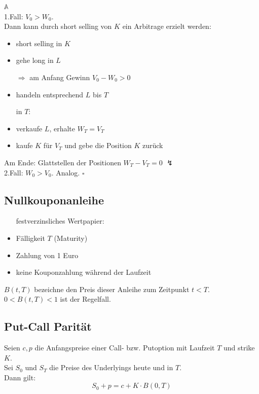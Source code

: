 \underline{$\mathds{A}$} \\
1.Fall: $V_0>W_0$. \\
Dann kann durch short selling von $K$ ein Arbitrage erzielt werden:
\begin{itemize}
	\item short selling in $K$
	\item gehe long in $L$
	\item[$\Rightarrow$ am Anfang Gewinn $V_0-W_0>0$]
	\item handeln entsprechend $L$ bis $T$
	\item[in $T$:]
	\item verkaufe $L$, erhalte $W_T = V_T$ 
	\item kaufe $K$ für $V_T$ und gebe die Position $K$ zurück
\end{itemize}
Am Ende: Glattstellen der Positionen $W_T - V_T = 0$ \textbf{$\lightning$} \\

2.Fall: $W_0>V_0$. Analog.
\hfill $\square$


\subsection{Nullkouponanleihe}
\label{sub: nullkouponanleihe}
\begin{itemize}
	\item[festverzinsliches Wertpapier:]
	\item Fälligkeit $T$ (Maturity)
	\item Zahlung von 1 Euro
	\item keine Kouponzahlung während der Laufzeit
\end{itemize}
$B(t,T)$ bezeichne den Preis dieser Anleihe zum Zeitpunkt $t<T$. $0<B(t,T)<1$ ist der Regelfall.


\subsection{Put-Call Parität}
\label{sub: put-call_parität}
Seien $c,p$ die Anfangspreise einer Call- bzw. Putoption mit Laufzeit $T$ und strike $K$.\\
Sei $S_0$ und $S_T$ die Preise des Underlyings heute und in $T$. \\
Dann gilt: 
\[
S_0 + p = c + K\cdot B(0,T)
\]

